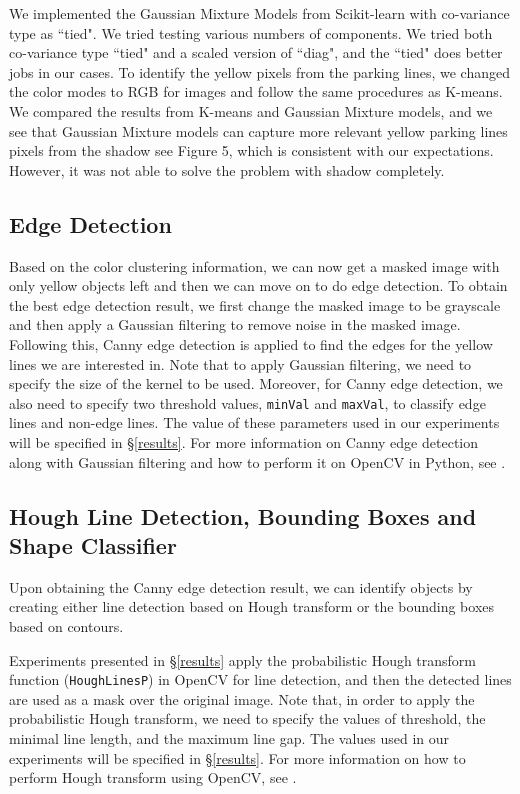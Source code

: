 \documentclass{m2pi}
\begin{document}
{\color{red}We implemented the Gaussian Mixture Models from Scikit-learn with co-variance type as ``tied". We tried  testing various numbers of components. We tried both co-variance type ``tied" and  a scaled version of ``diag", and the  ``tied" does better jobs in our cases. } To identify the yellow pixels from the parking lines, we changed the color modes to RGB for images and follow the same procedures as K-means.  We compared the results from K-means and Gaussian Mixture models, and we see that Gaussian Mixture models can capture more relevant yellow parking lines pixels from the shadow see Figure 5, which is consistent with our expectations. However, it was not able to solve the problem with shadow completely.  


\subsection{Edge Detection}
Based on the color clustering information, we can now get a masked image 
with only yellow objects left and then we can move on to do edge detection. 
To obtain the best edge 
detection result, we first change the masked image to be grayscale and 
then apply a Gaussian filtering \cite[\S 3.1]{Szeliski}
to remove noise in the masked image. 
Following this, Canny edge detection \cite{canny} is applied to 
find the edges for the 
yellow lines we are interested in. Note that to apply Gaussian filtering,
we need to specify the size of the kernel to be used. Moreover, for Canny edge
detection, we also need to specify two threshold values, \verb+minVal+ and \verb+maxVal+, 
to classify edge lines and non-edge lines. The value 
of these parameters used in our experiments will be specified 
in \S \ref{results}.
For more information on Canny edge detection
along with Gaussian filtering and how to perform it on OpenCV in Python, 
see \cite{opencvt}.


\subsection{Hough Line Detection, Bounding Boxes and Shape Classifier}\label{lineandbox}
Upon obtaining the Canny edge detection result, we can identify objects by creating either line detection based on Hough transform \cite[\S 7.4.2]{Szeliski} 
or the bounding boxes based on contours.  

Experiments presented in \S \ref{results} apply the probabilistic 
Hough transform function (\verb+HoughLinesP+) \cite{Matas} in OpenCV for line detection, and then
the detected lines are used as a mask over the original image. Note that, in order to apply 
the probabilistic Hough transform, we need to specify the values of threshold, 
the minimal line length, and the maximum line gap. The values used in our
experiments will be specified in \S \ref{results}. For more information on how
to perform Hough transform using OpenCV, see \cite{opencvt}.
\end{document}
